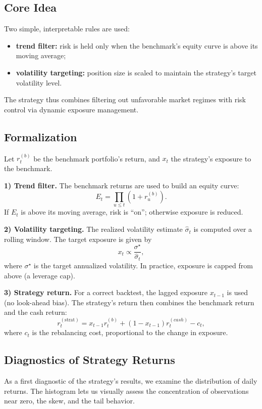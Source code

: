 \documentclass[12pt]{article}
\begin{document}
\subsection*{Core Idea}
Two simple, interpretable rules are used:
\begin{itemize}
    \item \textbf{trend filter:} risk is held only when the benchmark's equity curve is above its moving average;
    \item \textbf{volatility targeting:} position size is scaled to maintain the strategy's target volatility level.
\end{itemize}

The strategy thus combines filtering out unfavorable market regimes with risk control via dynamic exposure management.

\subsection*{Formalization}
Let \(r_t^{(b)}\) be the benchmark portfolio's return, and \(x_t\) the strategy's exposure to the benchmark.

\textbf{1) Trend filter.}
The benchmark returns are used to build an equity curve:
\[
E_t = \prod_{u \le t}(1+r_u^{(b)}).
\]
If \(E_t\) is above its moving average, risk is ``on''; otherwise exposure is reduced.

\textbf{2) Volatility targeting.}
The realized volatility estimate \(\widehat{\sigma}_t\) is computed over a rolling window. The target exposure is given by
\[
x_t \propto \frac{\sigma^\star}{\widehat{\sigma}_t},
\]
where \(\sigma^\star\) is the target annualized volatility. In practice, exposure is capped from above (a leverage cap).

\textbf{3) Strategy return.}
For a correct backtest, the lagged exposure \(x_{t-1}\) is used (no look-ahead bias). The strategy's return then combines the benchmark return and the cash return:
\[
r_t^{(\text{strat})} = x_{t-1} r_t^{(b)} + (1-x_{t-1}) r_t^{(cash)} - c_t,
\]
where \(c_t\) is the rebalancing cost, proportional to the change in exposure.

\subsection*{Diagnostics of Strategy Returns}

As a first diagnostic of the strategy's results, we examine the distribution of daily returns. The histogram lets us visually assess the concentration of observations near zero, the skew, and the tail behavior.
\end{document}
